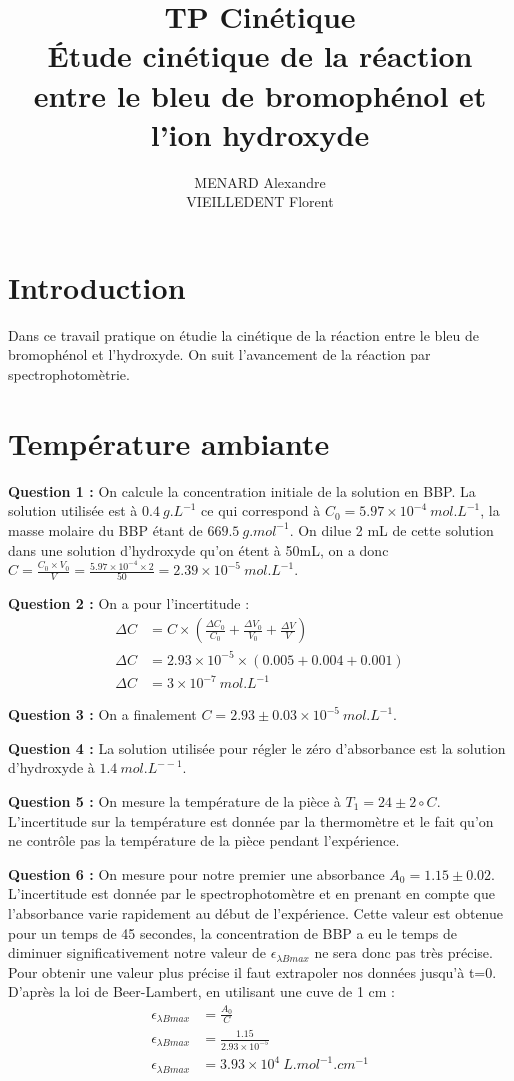 \documentclass[12pt]{article}
\title{\textbf{TP Cinétique} \\Étude cinétique de la réaction entre le bleu de bromophénol et l'ion hydroxyde}
\author{MENARD Alexandre \\ VIEILLEDENT Florent}
\begin{document}
\maketitle

\section*{Introduction}
Dans ce travail pratique on étudie la cinétique de la réaction entre le bleu de bromophénol et l'hydroxyde.
On suit l'avancement de la réaction par spectrophotomètrie.

\section{Température ambiante}

\textbf{Question 1 :} On calcule la concentration initiale de la solution en BBP. 
La solution utilisée est à $0.4 \ g.L^{-1}$ ce qui correspond à $C_0=5.97\times 10^{-4} \ mol.L^{-1}$, la masse molaire du BBP étant de $669.5 \ g.mol^{-1}$.
On dilue 2 mL de cette solution dans une solution d'hydroxyde qu'on étent à 50mL, on a donc $C=\frac{C_0 \times V_0}{V}=\frac{5.97\times 10^{-4}\times 2}{50}=2.39\times 10^{-5}\ mol.L^{-1}$.

\textbf{Question 2 :} On a pour l'incertitude :
\begin{align*}
    \Delta C &= C \times \left( \frac{\Delta C_0}{C_0} + \frac{\Delta V_0}{V_0} + \frac{\Delta V}{V} \right) \\
    \Delta C &= 2.93\times 10^{-5} \times \left( 0.005 + 0.004 + 0.001 \right) \\
    \Delta C &= 3\times 10^{-7} \ mol.L^{-1}
\end{align*}

\textbf{Question 3 :} On a finalement $C= 2.93 \pm 0.03 \times 10^{-5}\ mol.L^{-1}$.

\textbf{Question 4 :} La solution utilisée pour régler le zéro d'absorbance est la solution d'hydroxyde à $1.4 \ mol.L^{--1}$.

\textbf{Question 5 :} On mesure la température de la pièce à $T_1 = 24 \pm 2 \circ C$. 
L'incertitude sur la température est donnée par la thermomètre et le fait qu'on ne contrôle pas la température de la pièce pendant l'expérience.

\textbf{Question 6 :} On mesure pour notre premier une absorbance $A_0=1.15\pm 0.02$. L'incertitude est donnée par le spectrophotomètre et en prenant en compte que l'absorbance varie rapidement au début de l'expérience.
Cette valeur est obtenue pour un temps de 45 secondes, la concentration de BBP a eu le temps de diminuer significativement notre valeur de $\epsilon_{\lambda Bmax}$ ne sera donc pas très précise.
Pour obtenir une valeur plus précise il faut extrapoler nos données jusqu'à t=0.
D'après la loi de Beer-Lambert, en utilisant une cuve de 1 cm :
\begin{align*}
    \epsilon_{\lambda Bmax} &= \frac{A_0}{C} \\
    \epsilon_{\lambda Bmax} &= \frac{1.15}{2.93\times 10^{-5}} \\
    \epsilon_{\lambda Bmax} &= 3.93 \times 10^4 \ L.mol^{-1}.cm^{-1}
\end{align*}
\end{document}
